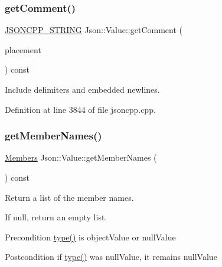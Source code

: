 \subsubsection{\texorpdfstring{get\+Comment()}{getComment()}\hspace{0.1cm}{\footnotesize\ttfamily [2/2]}}
{\footnotesize\ttfamily \hyperlink{config_8h_a1e723f95759de062585bc4a8fd3fa4be}{J\+S\+O\+N\+C\+P\+P\+\_\+\+S\+T\+R\+I\+NG} Json\+::\+Value\+::get\+Comment (\begin{DoxyParamCaption}\item[{\hyperlink{namespace_json_a4fc417c23905b2ae9e2c47d197a45351}{Comment\+Placement}}]{placement }\end{DoxyParamCaption}) const}



Include delimiters and embedded newlines. 



Definition at line 3844 of file jsoncpp.\+cpp.

\hypertarget{class_json_1_1_value_a5fa4e5279e83a421f9c128dd78be652b}{}\label{class_json_1_1_value_a5fa4e5279e83a421f9c128dd78be652b} 
\subsubsection{\texorpdfstring{get\+Member\+Names()}{getMemberNames()}\hspace{0.1cm}{\footnotesize\ttfamily [1/2]}}
{\footnotesize\ttfamily \hyperlink{class_json_1_1_value_a9ae9069983fc38f1928d76f9c79ac64d}{Members} Json\+::\+Value\+::get\+Member\+Names (\begin{DoxyParamCaption}{ }\end{DoxyParamCaption}) const}



Return a list of the member names. 

If null, return an empty list. \begin{DoxyPrecond}{Precondition}
\hyperlink{class_json_1_1_value_a8ce61157a011894f0252ceed232312de}{type()} is object\+Value or null\+Value 
\end{DoxyPrecond}
\begin{DoxyPostcond}{Postcondition}
if \hyperlink{class_json_1_1_value_a8ce61157a011894f0252ceed232312de}{type()} was null\+Value, it remains null\+Value 
\end{DoxyPostcond}
\hypertarget{class_json_1_1_value_a79d7725dce6260317333e69022367ac9}{}\label{class_json_1_1_value_a79d7725dce6260317333e69022367ac9} 
